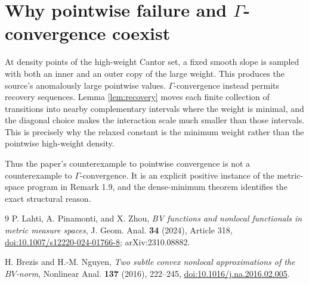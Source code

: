 \documentclass[11pt]{article}
\begin{document}
\section{Why pointwise failure and
\texorpdfstring{\(\Gamma\)}{Gamma}-convergence coexist}

At density points of the high-weight Cantor set, a fixed smooth slope
is sampled with both an inner and an outer copy of the large weight.
This produces the source's anomalously large pointwise values.
\(\Gamma\)-convergence instead permits recovery sequences. Lemma
\ref{lem:recovery} moves each finite collection of transitions into
nearby complementary intervals where the weight is minimal, and the
diagonal choice makes the interaction scale much smaller than those
intervals. This is precisely why the relaxed constant is the minimum
weight rather than the pointwise high-weight density.

Thus the paper's counterexample to pointwise convergence is not a
counterexample to \(\Gamma\)-convergence. It is an explicit positive
instance of the metric-space program in Remark 1.9, and the dense-minimum
theorem identifies the exact structural reason.

\begin{thebibliography}{9}
P. Lahti, A. Pinamonti, and X. Zhou,
\emph{BV functions and nonlocal functionals in metric measure spaces},
J. Geom. Anal. \textbf{34} (2024), Article 318,
\href{https://doi.org/10.1007/s12220-024-01766-8}{doi:10.1007/s12220-024-01766-8};
arXiv:2310.08882.

H. Brezis and H.-M. Nguyen,
\emph{Two subtle convex nonlocal approximations of the \(BV\)-norm},
Nonlinear Anal. \textbf{137} (2016), 222--245,
\href{https://doi.org/10.1016/j.na.2016.02.005}{doi:10.1016/j.na.2016.02.005}.
\end{thebibliography}
\end{document}
